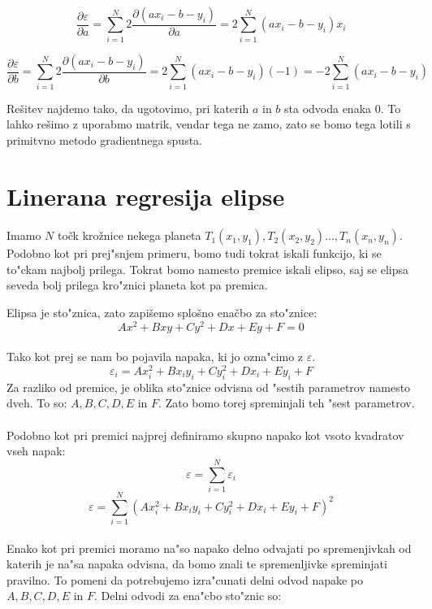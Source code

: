 \documentclass[a4paper, 12pt]{article}
\begin{document}
	$$\frac{\partial \varepsilon}{\partial a} =
	\sum_{i=1}^{N} 2 \frac{\partial (a x_i - b - y_i)}{\partial a} =
	2 \sum_{i=1}^{N} (a x_i - b - y_i)x_i$$

	$$\frac{\partial \varepsilon}{\partial b} =
	\sum_{i=1}^{N} 2 \frac{\partial (a x_i - b - y_i)}{\partial b} =
	2 \sum_{i=1}^{N} (a x_i - b - y_i)(-1) = -2 \sum_{i=1}^{N} (a x_i - b - y_i)$$

	Rešitev najdemo tako, da ugotovimo, pri katerih $a$ in $b$ sta odvoda enaka 0. To lahko rešimo z uporabmo matrik, vendar tega ne zamo, zato se bomo tega lotili s primitvno metodo gradientnega spusta.


	\section*{Linerana regresija elipse}
	\paragraph{}
	Imamo $N$ točk krožnice nekega planeta $T_1(x_1, y_1), T_2(x_2, y_2) \ldots, T_n(x_n, y_n)$. Podobno kot pri prej"snjem primeru, bomo tudi tokrat iskali funkcijo, ki se to"ckam najbolj prilega. Tokrat bomo namesto premice iskali elipso, saj se elipsa seveda bolj prilega kro"znici planeta kot pa premica.


	Elipsa je sto"znica, zato zapišemo splošno enačbo za sto"znice:
	$$Ax^2 + Bxy + Cy^2 + Dx + Ey + F = 0$$

	\paragraph{}
	Tako kot prej se nam bo pojavila napaka, ki jo ozna"cimo z $\varepsilon$.
	$$\varepsilon_i = Ax_i^2 + Bx_iy_i + Cy_i^2 + Dx_i + Ey_i + F$$
	Za razliko od premice, je oblika sto"znice odvisna od "sestih parametrov namesto dveh. To so: $A, B, C, D, E$ in $F$. Zato bomo torej spreminjali teh "sest parametrov.

	\paragraph{}
	Podobno kot pri premici najprej definiramo skupno napako kot vsoto kvadratov vseh napak:
	\[\varepsilon = \sum_{i=1}^{N}\varepsilon_i\]
	\[\varepsilon = \sum_{i=1}^{N} (Ax_i^2 + Bx_iy_i + Cy_i^2 + Dx_i + Ey_i + F)^2\]

	\paragraph{}
	Enako kot pri premici moramo na"so napako delno odvajati po spremenjivkah od katerih je na"sa napaka odvisna, da bomo znali te spremenljivke spreminjati pravilno. To pomeni da potrebujemo izra"cunati delni odvod napake po $A, B, C, D, E$ in $F$. Delni odvodi za ena"cbo sto"znic so:
\end{document}
